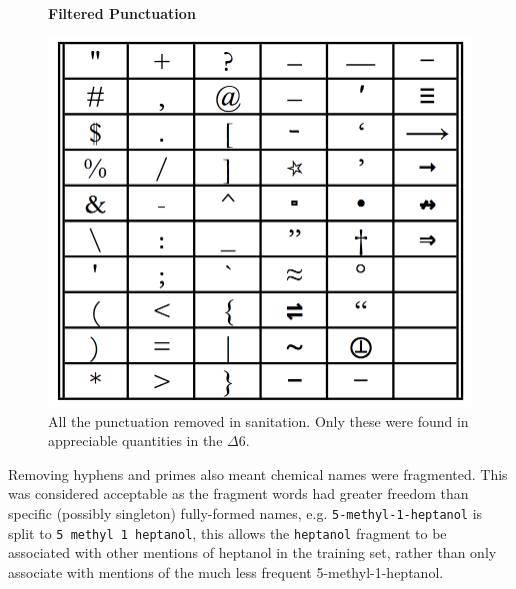 \begin{figure}[H]
    \centering
    \textbf{Filtered Punctuation }\par\medskip
    \includegraphics[scale=0.2]{Algorithm/punct_table.png}
    \caption[Punctuation removed in sanitation processing]{All the punctuation removed in sanitation. Only these were found in appreciable quantities in the $\Delta6$. }
     \label{fig:punct}
\end{figure}
Removing hyphens and primes also meant chemical names were fragmented. This was considered acceptable as the fragment words had greater freedom than specific (possibly singleton) fully-formed names, e.g. \texttt{5-methyl-1-heptanol} is split to \texttt{5 methyl 1 heptanol}, this allows the \texttt{heptanol} fragment to be associated with other mentions of heptanol in the training set, rather than only associate with mentions of the much less frequent 5-methyl-1-heptanol. 

